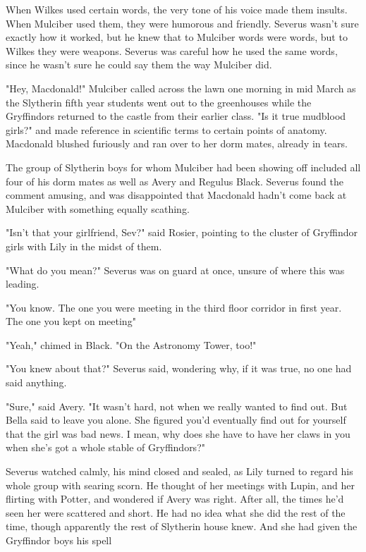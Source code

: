 When Wilkes used certain words, the very tone of his voice made them insults. When Mulciber used them, they were humorous and friendly. Severus wasn't sure exactly how it worked, but he knew that to Mulciber words were words, but to Wilkes they were weapons. Severus was careful how he used the same words, since he wasn't sure he could say them the way Mulciber did.

"Hey, Macdonald!" Mulciber called across the lawn one morning in mid March as the Slytherin fifth year students went out to the greenhouses while the Gryffindors returned to the castle from their earlier class. "Is it true mudblood girls{\el}?" and made reference in scientific terms to certain points of anatomy. Macdonald blushed furiously and ran over to her dorm mates, already in tears.

The group of Slytherin boys for whom Mulciber had been showing off included all four of his dorm mates as well as Avery and Regulus Black. Severus found the comment amusing, and was disappointed that Macdonald hadn't come back at Mulciber with something equally scathing.

"Isn't that your girlfriend, Sev?" said Rosier, pointing to the cluster of Gryffindor girls with Lily in the midst of them.

"What do you mean?" Severus was on guard at once, unsure of where this was leading.

"You know. The one you were meeting in the third floor corridor in first year. The one you kept on meeting{\el}"

"Yeah," chimed in Black. "On the Astronomy Tower, too!"

"You knew about that?" Severus said, wondering why, if it was true, no one had said anything.

"Sure," said Avery. "It wasn't hard, not when we really wanted to find out. But Bella said to leave you alone. She figured you'd eventually find out for yourself that the girl was bad news. I mean, why does she have to have her claws in you when she's got a whole stable of Gryffindors?"

Severus watched calmly, his mind closed and sealed, as Lily turned to regard his whole group with searing scorn. He thought of her meetings with Lupin, and her flirting with Potter, and wondered if Avery was right. After all, the times he'd seen her were scattered and short. He had no idea what she did the rest of the time, though apparently the rest of Slytherin house knew. And she had given the Gryffindor boys his spell{\el}

